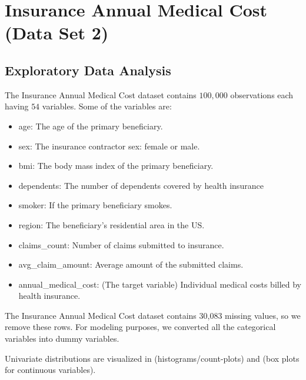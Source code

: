 \documentclass{article}
\begin{document}
\section{Insurance Annual Medical Cost (Data Set 2)}

\subsection{Exploratory Data Analysis}

The Insurance Annual Medical Cost dataset contains $100,000$ observations each having $54$ variables. Some of the variables are:
\begin{itemize}
	\item age: The age of the primary beneficiary.
	\item sex: The insurance contractor sex: female or male.
	\item bmi: The body mass index of the primary beneficiary.
	\item dependents: The number of dependents covered by health insurance
	\item smoker: If the primary beneficiary smokes.
	\item region: The beneficiary's residential area in the US.
	\item claims\_count: Number of claims submitted to insurance.
	\item avg\_claim\_amount: Average amount of the submitted claims.
	\item annual\_medical\_cost: (The target variable) Individual medical costs billed by health insurance.
\end{itemize}

The Insurance Annual Medical Cost dataset contains 30,083 missing values, so we remove these rows. For modeling purposes, we converted all the categorical variables into dummy variables.

Univariate distributions are visualized in  (histograms/count-plots) and  (box plots for continuous variables).

\end{document}
